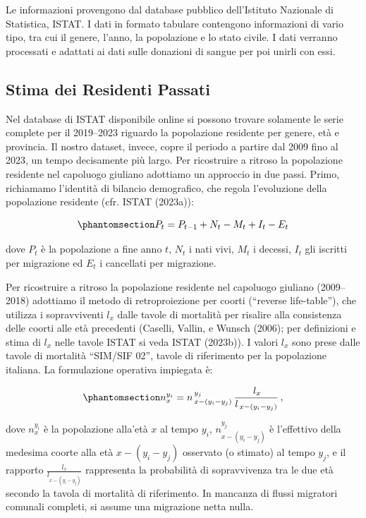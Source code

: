 \documentclass[
  italian,
  a4paper,
  a4paper,
  twoside,
  open=right,
  12pt]{scrbook}
\theoremstyle{definition}
\theoremstyle{remark}
\begin{document}
Le informazioni provengono dal database pubblico dell'Istituto Nazionale
di Statistica, ISTAT. I dati in formato tabulare contengono informazioni
di vario tipo, tra cui il genere, l'anno, la popolazione e lo stato
civile. I dati verranno processati e adattati ai dati sulle donazioni di
sangue per poi unirli con essi.

\subsection{Stima dei Residenti
Passati}\label{stima-dei-residenti-passati}

Nel database di ISTAT disponibile online si possono trovare solamente le
serie complete per il 2019--2023 riguardo la popolazione residente per
genere, età e provincia. Il nostro dataset, invece, copre il periodo a
partire dal 2009 fino al 2023, un tempo decisamente più largo. Per
ricostruire a ritroso la popolazione residente nel capoluogo giuliano
adottiamo un approccio in due passi. Primo, richiamamo l'identità di
bilancio demografico, che regola l'evoluzione della popolazione
residente (cfr. ISTAT (2023a)):

\begin{equation}\phantomsection\label{eq-bilancio_demografico}{
P_t = P_{t-1} + N_t - M_t + I_t - E_t
}\end{equation}

dove \(P_t\) è la popolazione a fine anno \(t\), \(N_t\) i nati vivi,
\(M_t\) i decessi, \(I_t\) gli iscritti per migrazione ed \(E_t\) i
cancellati per migrazione.

Per ricostruire a ritroso la popolazione residente nel capoluogo
giuliano (2009--2018) adottiamo il metodo di retroproiezione per coorti
(``reverse life-table''), che utilizza i sopravviventi \(l_x\) dalle
tavole di mortalità per risalire alla consistenza delle coorti alle età
precedenti (Caselli, Vallin, e Wunsch (2006); per definizioni e stima di
\(l_x\) nelle tavole ISTAT si veda ISTAT (2023b)). I valori \(l_x\) sono
prese dalle tavole di mortalità ``SIM/SIF 02'', tavole di riferimento
per la popolazione italiana. La formulazione operativa impiegata è:

\begin{equation}\phantomsection\label{eq-reverse_life_table}{
n_{x}^{y_i}
  = n_{\,x-(y_i-y_j)}^{\,y_j}\,
    \frac{\,l_x}{l_{\,x-(y_i-y_j)}} \,,
}\end{equation}

dove \(n_x^{y_i}\) è la popolazione alla'età \(x\) al tempo \(y_i\),
\(n_{x-(y_i-y_j)}^{y_j}\) è l'effettivo della medesima coorte alla età
\(x-(y_i-y_j)\) osservato (o stimato) al tempo \(y_j\), e il rapporto
\(\frac{l_x}{l_{x-(y_i-y_j)}}\) rappresenta la probabilità di
sopravvivenza tra le due età secondo la tavola di mortalità di
riferimento. In mancanza di flussi migratori comunali completi, si
assume una migrazione netta nulla.
\end{document}
